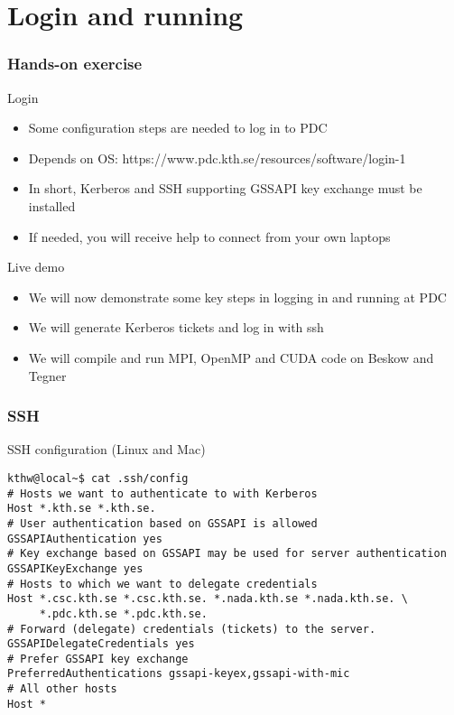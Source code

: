 \section*{Login and running}

\begin{frame}[fragile]
  \frametitle{Hands-on exercise}

\footnotesize
\begin{exampleblock}{\large{Login}}
\begin{itemize}
  \item Some configuration steps are needed to log in to PDC 
  \item Depends on OS: https://www.pdc.kth.se/resources/software/login-1
  \item In short, Kerberos and SSH supporting GSSAPI key exchange must be installed 
  \item If needed, you will receive help to connect from your own laptops
\end{itemize}
\end{exampleblock}

\begin{exampleblock}{\large{Live demo}}
\begin{itemize}
  \item We will now demonstrate some key steps in logging in and running at PDC
  \item We will generate Kerberos tickets and log in with ssh
  \item We will compile and run MPI, OpenMP and CUDA code on Beskow and Tegner
\end{itemize}
\end{exampleblock}

\end{frame}


\begin{frame}[fragile]
  \frametitle{SSH}
  \begin{alertblock}{SSH configuration (Linux and Mac)}
    \verbatimfont{\footnotesize}
    \begin{verbatim}
kthw@local~$ cat .ssh/config
# Hosts we want to authenticate to with Kerberos
Host *.kth.se *.kth.se.
# User authentication based on GSSAPI is allowed
GSSAPIAuthentication yes
# Key exchange based on GSSAPI may be used for server authentication
GSSAPIKeyExchange yes
# Hosts to which we want to delegate credentials
Host *.csc.kth.se *.csc.kth.se. *.nada.kth.se *.nada.kth.se. \
     *.pdc.kth.se *.pdc.kth.se.
# Forward (delegate) credentials (tickets) to the server.
GSSAPIDelegateCredentials yes
# Prefer GSSAPI key exchange
PreferredAuthentications gssapi-keyex,gssapi-with-mic
# All other hosts
Host *

 \end{verbatim}
\end{alertblock}

\end{frame}

